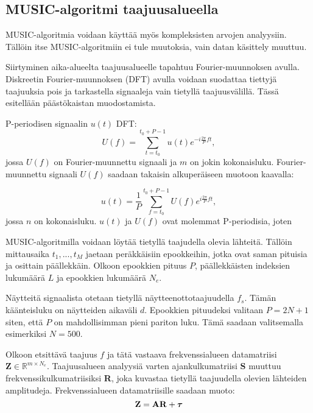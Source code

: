 \subsection{MUSIC-algoritmi taajuusalueella}
MUSIC-algoritmia voidaan käyttää myös kompleksisten arvojen analyysiin. Tällöin itse MUSIC-algoritmiin ei tule muutoksia, vain datan käsittely muuttuu.

Siirtyminen aika-alueelta taajuusalueelle tapahtuu Fourier-muunnoksen avulla. Diskreetin Fourier-muunnoksen (DFT) avulla voidaan suodattaa tiettyjä taajuuksia pois ja tarkastella signaaleja vain tietyllä taajuusvälillä. Tässä esitellään päästökaistan muodostamista.

P-periodisen signaalin $u(t)$ DFT:
\begin{equation}
    U(f) =  \sum_{t=t_0}^{t_0+P-1}u(t)e^{-i\frac{2\pi}{P}ft},
\end{equation}
jossa $U(f)$ on Fourier-muunnettu signaali ja $m$ on jokin kokonaisluku. Fourier-muunnettu signaali $U(f)$ saadaan takaisin alkuperäiseen muotoon kaavalla:

\begin{equation}
    u(t) = \frac{1}{P}\sum_{f=t_0}^{t_0+P-1}U(f)e^{i\frac{2\pi}{P}ft},
\end{equation}
jossa $n$ on kokonaisluku. $u(t)$ ja $U(f)$ ovat molemmat P-periodisia, joten  
 
MUSIC-algoritmilla voidaan löytää tietyllä taajudella olevia lähteitä. Tällöin mittausaika $t_1,...,t_M$ jaetaan peräkkäisiin epookkeihin, jotka ovat saman pituisia ja osittain päällekkäin. Olkoon epookkien pituus $P$, päällekkäisten indeksien lukumäärä $L$ ja epookkien lukumäärä $N_e$.

Näytteitä signaalista otetaan tietyllä näytteenottotaajuudella $f_s$. Tämän käänteisluku on näytteiden aikaväli $d$. Epookkien pituudeksi valitaan $P = 2N+1$ siten, että $P$ on mahdollisimman pieni pariton luku. Tämä saadaan valitsemalla esimerkiksi $N = 500$.

Olkoon etsittävä taajuus $f$ ja tätä vastaava frekvenssialueen datamatriisi $\mathbf{Z} \in \mathbb{R}^{m\times N_e}$. Taajuusalueen analyysiä varten ajankulkumatriisi \textbf{S} muuttuu frekvenssikulkumatriisiksi \textbf{R}, joka kuvastaa tietyllä taajuudella olevien lähteiden amplitudeja. Frekvenssialueen datamatriisille saadaan muoto:
\begin{equation}
    \mathbf{Z = AR+\text{\boldmath$\tau$}}
\end{equation}